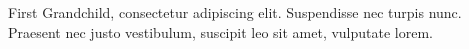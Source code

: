 \begin{Grandkids}	
	 First Grandchild, consectetur adipiscing elit. Suspendisse nec turpis nunc. Praesent nec justo vestibulum, suscipit leo sit amet, vulputate lorem.
\end{Grandkids}


